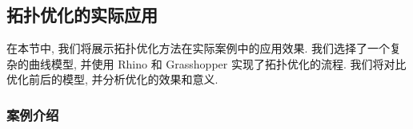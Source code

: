\subsection{拓扑优化的实际应用}




在本节中, 我们将展示拓扑优化方法在实际案例中的应用效果.
我们选择了一个复杂的曲线模型, 并使用 Rhino 和 Grasshopper 实现了拓扑优化的流程.
我们将对比优化前后的模型, 并分析优化的效果和意义.

\subsubsection{案例介绍}

